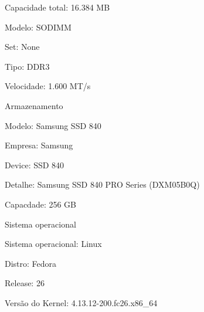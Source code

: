 \begin{alineas}
\begin{alineas}
     \item Capacidade total: 16.384 MB

     \item Modelo: SODIMM

     \item Set: None

     \item Tipo: DDR3

     \item Velocidade: 1.600 MT/s

  \end{alineas}

  \item Armazenamento

  \begin{alineas}

     \item Modelo: Samsung SSD 840

     \item Empresa: Samsung

     \item Device: SSD 840

     \item Detalhe: Samsung SSD 840 PRO Series (DXM05B0Q)

     \item Capacdade: 256 GB

  \end{alineas}

  \item Sistema operacional

  \begin{alineas}

     \item Sistema operacional: Linux

     \item Distro: Fedora

     \item Release: 26

     \item Versão do Kernel: 4.13.12-200.fc26.x86\_64

  \end{alineas}

\end{alineas}
